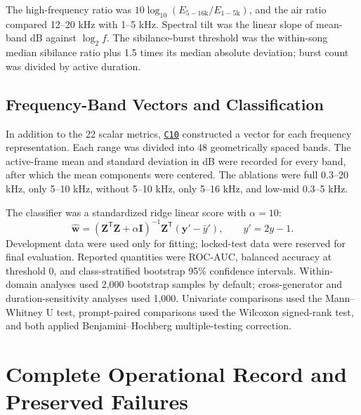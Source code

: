 \documentclass[11pt,a4paper]{article}
\newcommand{\coderef}[1]{\hyperlink{code:#1}{\texttt{#1}}}
\begin{document}
The high-frequency ratio was $10\log_{10}(E_{5-16\mathrm{k}}/E_{1-5\mathrm{k}})$, and the air ratio compared 12--20 kHz with 1--5 kHz. Spectral tilt was the linear slope of mean-band dB against $\log_2 f$. The sibilance-burst threshold was the within-song median sibilance ratio plus 1.5 times its median absolute deviation; burst count was divided by active duration.

\subsection{Frequency-Band Vectors and Classification}

In addition to the 22 scalar metrics, \coderef{C10} constructed a vector for each frequency representation. Each range was divided into 48 geometrically spaced bands. The active-frame mean and standard deviation in dB were recorded for every band, after which the mean components were centered. The ablations were full 0.3--20 kHz, only 5--10 kHz, without 5--10 kHz, only 5--16 kHz, and low-mid 0.3--5 kHz.

The classifier was a standardized ridge linear score with $\alpha=10$:
\begin{equation}
\hat{\mathbf{w}}=(\mathbf{Z}^{\mathsf T}\mathbf{Z}+\alpha\mathbf{I})^{-1}
\mathbf{Z}^{\mathsf T}(\mathbf{y}'-\bar{y}'),\qquad y'=2y-1.
\label{eq:ridge}
\end{equation}
Development data were used only for fitting; locked-test data were reserved for final evaluation. Reported quantities were ROC-AUC, balanced accuracy at threshold 0, and class-stratified bootstrap 95\% confidence intervals. Within-domain analyses used 2,000 bootstrap samples by default; cross-generator and duration-sensitivity analyses used 1,000. Univariate comparisons used the Mann--Whitney U test, prompt-paired comparisons used the Wilcoxon signed-rank test, and both applied Benjamini--Hochberg multiple-testing correction.

\section{Complete Operational Record and Preserved Failures}
\label{sec:operations}
\end{document}
